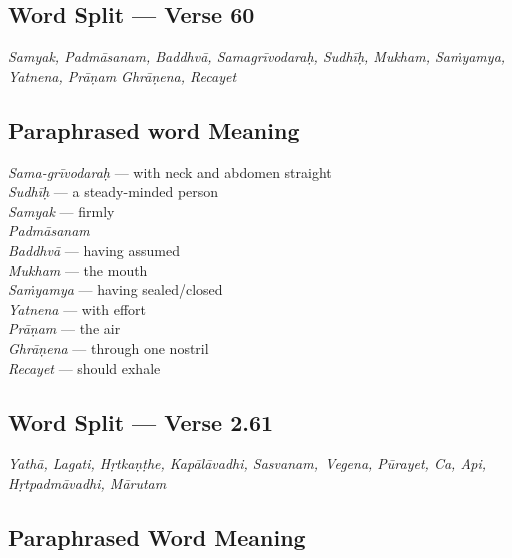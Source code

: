 \subsection*{Word Split --- Verse 60}


\textit{Samyak, Padmāsanam, Baddhvā, Samagrīvodaraḥ, Sudhīḥ, Mukham, Saṁyamya, Yatnena, Prāṇam Ghrāṇena, Recayet}

\subsection*{Paraphrased word Meaning}


\begin{multicols}{2}
\textit{Sama-grīvodaraḥ} --- with neck and abdomen straight \\
\textit{Sudhīḥ}  --- a steady-minded person \\
\textit{Samyak} --- firmly \\
\textit{Padmāsanam} \\
\textit{Baddhvā} --- having assumed \\
\textit{Mukham} --- the mouth \\
\textit{Saṁyamya} --- having sealed/closed \\
\textit{Yatnena} --- with effort \\
\textit{Prāṇam} --- the air \\
\textit{Ghrāṇena} --- through one nostril \\
\textit{Recayet} --- should exhale 
\end{multicols}

\subsection*{Word Split --- Verse 2.61}

\textit{Yathā, Lagati, Hṛtkaṇṭhe, Kapālāvadhi, Sasvanam, Vegena, Pūrayet, Ca, Api, Hṛtpadmāvadhi, Mārutam}

\subsection*{Paraphrased Word Meaning}

